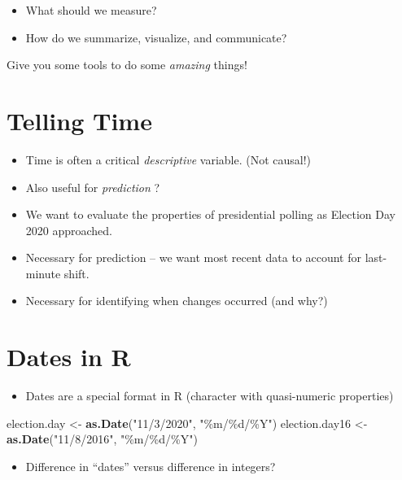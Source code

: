 \documentclass[
]{article}
\newenvironment{Shaded}{\begin{snugshade}}{\end{snugshade}}
\newcommand{\FunctionTok}[1]{\textcolor[rgb]{0.13,0.29,0.53}{\textbf{#1}}}
\newcommand{\NormalTok}[1]{#1}
\newcommand{\OtherTok}[1]{\textcolor[rgb]{0.56,0.35,0.01}{#1}}
\newcommand{\StringTok}[1]{\textcolor[rgb]{0.31,0.60,0.02}{#1}}
\providecommand{\tightlist}{%
  \setlength{\itemsep}{0pt}\setlength{\parskip}{0pt}}
\begin{document}
\begin{itemize}
\item
  What should we measure?
\item
  How do we summarize, visualize, and communicate?
\end{itemize}

Give you some tools to do some \emph{amazing} things!

\section{Telling Time}\label{telling-time}

\begin{itemize}
\item
  Time is often a critical \emph{descriptive} variable. (Not causal!)
\item
  Also useful for \emph{prediction} ?
\item
  We want to evaluate the properties of presidential polling as Election
  Day 2020 approached.
\item
  Necessary for prediction -- we want most recent data to account for
  last-minute shift.
\item
  Necessary for identifying when changes occurred (and why?)
\end{itemize}

\section{Dates in R}\label{dates-in-r}

\begin{itemize}
\tightlist
\item
  Dates are a special format in R (character with quasi-numeric
  properties)
\end{itemize}

\begin{Shaded}
\begin{Highlighting}[]
\NormalTok{election.day }\OtherTok{\textless{}{-}} \FunctionTok{as.Date}\NormalTok{(}\StringTok{"11/3/2020"}\NormalTok{, }\StringTok{"\%m/\%d/\%Y"}\NormalTok{)   }
\NormalTok{election.day16 }\OtherTok{\textless{}{-}} \FunctionTok{as.Date}\NormalTok{(}\StringTok{"11/8/2016"}\NormalTok{, }\StringTok{"\%m/\%d/\%Y"}\NormalTok{)   }
\end{Highlighting}
\end{Shaded}

\begin{itemize}
\tightlist
\item
  Difference in ``dates'' versus difference in integers?
\end{itemize}
\end{document}
